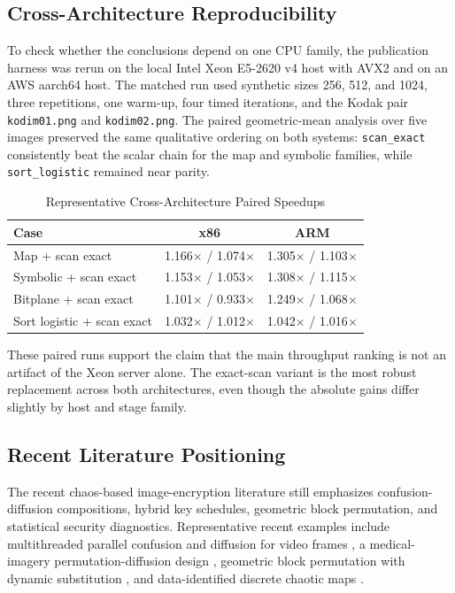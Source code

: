 \documentclass[twocolumn,runningheads]{svjour3}
\begin{document}
\subsection{Cross-Architecture Reproducibility}
To check whether the conclusions depend on one CPU family, the publication
harness was rerun on the local Intel Xeon E5-2620 v4 host with AVX2 and on an
AWS aarch64 host. The matched run used synthetic sizes
256, 512, and 1024, three repetitions, one warm-up, four timed iterations, and
the Kodak pair \texttt{kodim01.png} and \texttt{kodim02.png}. The paired
geometric-mean analysis over five images preserved the same qualitative
ordering on both systems: \texttt{scan\_exact} consistently beat the scalar
chain for the map and symbolic families, while \texttt{sort\_logistic}
remained near parity.

\begin{table}[t]
\caption{Representative Cross-Architecture Paired Speedups}
\label{tab:cross-arch}
\centering
\setlength{\tabcolsep}{3pt}
\begin{tabular}{lcc}
\toprule
\textbf{Case} & \textbf{x86} & \textbf{ARM} \\
\midrule
Map + scan exact & 1.166$\times$ / 1.074$\times$ & 1.305$\times$ / 1.103$\times$ \\
Symbolic + scan exact & 1.153$\times$ / 1.053$\times$ & 1.308$\times$ / 1.115$\times$ \\
Bitplane + scan exact & 1.101$\times$ / 0.933$\times$ & 1.249$\times$ / 1.068$\times$ \\
Sort logistic + scan exact & 1.032$\times$ / 1.012$\times$ & 1.042$\times$ / 1.016$\times$ \\
\bottomrule
\end{tabular}
\end{table}

These paired runs support the claim that the main throughput ranking is not an
artifact of the Xeon server alone. The exact-scan variant is the most robust
replacement across both architectures, even though the absolute gains differ
slightly by host and stage family.

\subsection{Recent Literature Positioning}
The recent chaos-based image-encryption literature still emphasizes
confusion-diffusion compositions, hybrid key schedules, geometric block
permutation, and statistical security diagnostics. Representative recent
examples include multithreaded parallel confusion and diffusion for video
frames \cite{jiang2023}, a medical-imagery permutation-diffusion design
\cite{sanaboina2024}, geometric block permutation with dynamic substitution
\cite{ali2025}, and data-identified discrete chaotic maps \cite{li2026}.
\end{document}
